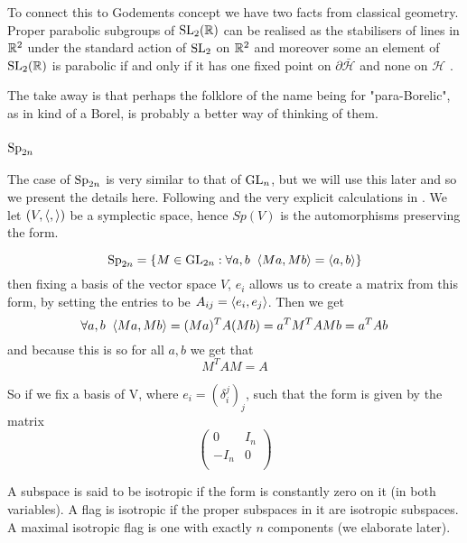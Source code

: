 \begin{Remark}
    To connect this to Godements concept we have two facts from classical geometry. Proper parabolic subgroups of \(\SL_2(\R)\) can be realised as the stabilisers of lines in \(\R^2\) under the standard action of \(\operatorname{SL}_2\) on \(\R^2\) \cite[2.6]{borelAutomorphicFormsSL21997} and moreover some an element of \(\SL_2(\R)\) is parabolic if and only if it has one fixed point on \(\partial\bar{\mathcal{H}}\) and none on \(\mathcal{H}\) \cite[3.5]{borelAutomorphicFormsSL21997}. 

    The take away is that perhaps the folklore of the name being for "para-Borelic", as in kind of a Borel, is probably a better way of thinking of them.
\end{Remark}

\subsubsection{\(\operatorname{Sp}_{2n}\)}
The case of \(\operatorname{Sp}_{2n}\) is very similar to that of \(\operatorname{GL}_n\), but we will use this later and so we present the details here. Following \cite{conradStandardParabolicSubgroups} and the very explicit calculations in  \cite[\S 8]{BuildingsClassicalGroups}. We let \((V, \langle ,\rangle)\) be a symplectic space, hence \(Sp(V)\) is the automorphisms preserving the form.
\begin{example}
    \[\operatorname{Sp}_{2n} = \{M\in \operatorname{GL}_{2n} :\forall a,b \;\; \langle Ma, Mb\rangle = \langle a,b\rangle\}\]
    then fixing a basis of the vector space \(V\), \(e_i\) allows us to create a matrix from this form, by setting the entries to be \(A_{ij} = \langle e_i, e_j\rangle\). Then we get 
        \[\forall a,b \;\; \langle Ma, Mb\rangle = (Ma)^T A (Mb) = a^T M^T A M b= a^TAb \]
        and because this is so for all \(a,b\) we get that 
        \[M^T A M = A\]

        So if we fix a basis of V, where \(e_i = (\delta_i^j)_j\), such that the form is given by the matrix
        \[\begin{pmatrix}
            0 & I_n \\
            -I_n & 0\\
        \end{pmatrix}\]
\end{example}

A subspace is said to be isotropic if the form is constantly zero on it (in both variables). A flag is isotropic if the proper subspaces in it are isotropic subspaces. A maximal isotropic flag is one with exactly \(n\) components (we elaborate later).

